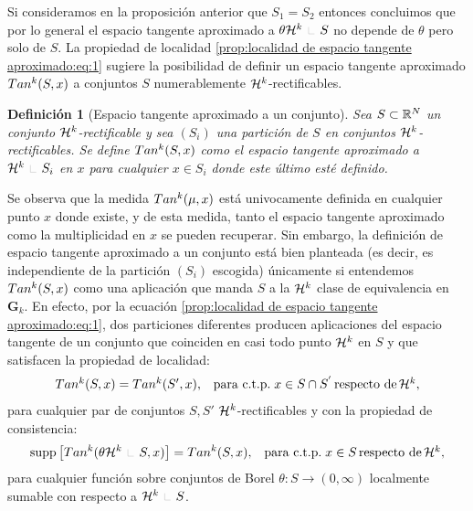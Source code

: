 \documentclass[a4paper,11pt,spanish, twoside, leqno]{tfm-uam}
\newtheorem{defi}[teo]{Definición}
\begin{document}
Si consideramos en la proposición anterior que $S_{1}=S_{2}$ entonces concluimos que por lo general el espacio tangente aproximado a $\theta \Hm{k}\Radot S$ no depende de $\theta$ pero solo de $S$. La propiedad de localidad \ref{prop:localidad de espacio tangente aproximado:eq:1} sugiere la posibilidad de definir un espacio tangente aproximado $\Tan{k}{S}{x}$ a conjuntos $S$ numerablemente $\mathcal{H}^{k}$-rectificables.
\begin{defi}[Espacio tangente aproximado a un conjunto] 
Sea $S\subset \mathbb{R}^{N}$ un conjunto $\mathcal{H}^{k}$-rectificable y sea $(S_{i})$ una partición de $S$ en conjuntos $\mathcal{H}^{k}$-rectificables. Se define $\Tan{k}{S}{x}$ como el espacio tangente aproximado a $\Hm{k}\Radot S_{i}$ en $x$ para cualquier $x\in S_{i}$ donde este último esté definido.
\end{defi}

Se observa que la medida $\Tan{k}{\mu}{x}$ está univocamente definida en cualquier punto $x$ donde existe, y de esta medida, tanto el espacio tangente aproximado como la multiplicidad en $x$ se pueden recuperar. Sin embargo, la definición de espacio tangente aproximado a un conjunto está bien planteada (es decir, es independiente de la partición $(S_{i})$ escogida) únicamente si entendemos $\Tan{k}{S}{x}$ como una aplicación que manda $S$ a la $\mathcal{H}^{k}$ clase de equivalencia en $\mathbf{G}_{k}$. En efecto, por la ecuación \ref{prop:localidad de espacio tangente aproximado:eq:1}, dos particiones diferentes producen aplicaciones del espacio tangente de un conjunto que coinciden en casi todo punto $\mathcal{H}^{k}$ en $S$ y que satisfacen la propiedad de localidad:
\begin{align}\label{eq:1:propiedad de localidad del espacio tangente aproximado a un conjunto}
\begin{array}{ll}
\Tan{k}{S}{x}=\Tan{k}{S'}{x},& \text{para c.t.p.}\; x\in S\cap S^{'}\, \text{respecto de}\, \Hm{k},
\end{array}
\end{align}
para cualquier par de conjuntos $S, S'$ $\mathcal{H}^{k}$-rectificables y con la propiedad de consistencia:
\begin{align}\label{eq:1:propiedad de consistencia espacio tangente aproximado a un conjunto}
\begin{array}{ll}
\displaystyle
\supp\left[ \Tan{k}{\theta \Hm{k}\Radot S}{x}\right ]=\Tan{k}{S}{x},& \text{para c.t.p.}\; x\in S\, \text{respecto de}\, \Hm{k},
\end{array}
\end{align}
para cualquier función sobre conjuntos de Borel $\theta:S\to (0,\infty)$ localmente sumable con respecto a $\Hm{k}\Radot S$.
\end{document}
